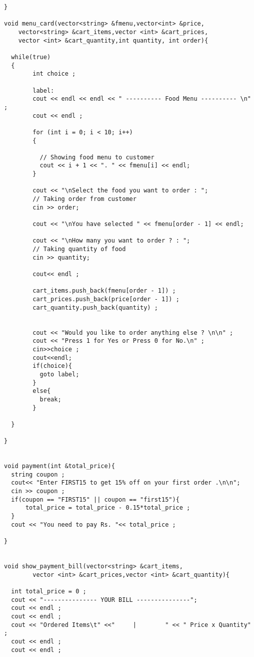 \documentclass[11pt, a4paper]{article}
\begin{document}
\begin{lstlisting}
}

void menu_card(vector<string> &fmenu,vector<int> &price,
    vector<string> &cart_items,vector <int> &cart_prices,
    vector <int> &cart_quantity,int quantity, int order){

  while(true)
  {
        int choice ;

        label:
        cout << endl << endl << " ---------- Food Menu ---------- \n" ;
        cout << endl ;
        
        for (int i = 0; i < 10; i++)
        {

          // Showing food menu to customer
          cout << i + 1 << ". " << fmenu[i] << endl;
        }

        cout << "\nSelect the food you want to order : ";
        // Taking order from customer
        cin >> order;

        cout << "\nYou have selected " << fmenu[order - 1] << endl;

        cout << "\nHow many you want to order ? : ";
        // Taking quantity of food
        cin >> quantity;
     
        cout<< endl ;

        cart_items.push_back(fmenu[order - 1]) ;
        cart_prices.push_back(price[order - 1]) ;
        cart_quantity.push_back(quantity) ;
       
        
        cout << "Would you like to order anything else ? \n\n" ;
        cout << "Press 1 for Yes or Press 0 for No.\n" ;
        cin>>choice ;
        cout<<endl;
        if(choice){
          goto label;
        }
        else{
          break;
        }
       
  }

}


void payment(int &total_price){
  string coupon ;
  cout<< "Enter FIRST15 to get 15% off on your first order .\n\n";
  cin >> coupon ;
  if(coupon == "FIRST15" || coupon == "first15"){
      total_price = total_price - 0.15*total_price ;
  }
  cout << "You need to pay Rs. "<< total_price ;
   
}


void show_payment_bill(vector<string> &cart_items,
        vector <int> &cart_prices,vector <int> &cart_quantity){

  int total_price = 0 ;
  cout << "--------------- YOUR BILL ---------------";
  cout << endl ;
  cout << endl ;
  cout << "Ordered Items\t" <<"     |        " << " Price x Quantity" ;
  cout << endl ;
  cout << endl ;


\end{lstlisting}
\end{document}

